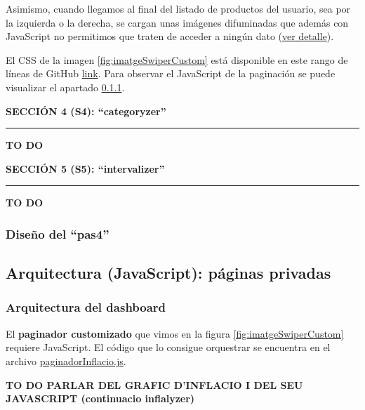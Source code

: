 \documentclass[a4paper,12pt]{report}
\begin{document}
	Asimismo, cuando llegamos al final del listado de productos del usuario, sea por la izquierda o la derecha, se cargan unas imágenes difuminadas que además con JavaScript no permitimos que traten de acceder a ningún dato (\href{https://github.com/blackcub3s/mercApp/blob/main/APP%20WEB/__frontend__produccio__/app/img/dashboard/paginadorEsqDifuminat.png}{ver detalle}).
	
	El CSS de la imagen \ref{fig:imatgeSwiperCustom} está disponible en este rango de líneas de GitHub \href{https://github.com/blackcub3s/mercApp/blob/4ddc34194763af7a246ffabb14146ad9b4b2c5db/APP%20WEB/__frontend__produccio__/app/css/dashboard/estils.css#L155}{link}. Para observar el JavaScript de la paginación se puede visualizar el apartado \ref{sec:paginadorJavascriptArquitectura}.
	
	
	
	
	\noindent \textbf{SECCIÓN 4 (S4): ``categoryzer''}
	\hrule
	\vspace{.5em}
	
	\textbf{TO DO}
	
	
	\noindent \textbf{SECCIÓN 5 (S5): ``intervalizer''}
	\hrule
	\vspace{.5em}
	
	\textbf{TO DO}
	
	\subsubsection{Diseño del ``pas4''}
	
	\subsection{Arquitectura (JavaScript): páginas privadas}
	
	\subsubsection{Arquitectura del dashboard}
	\label{sec:paginadorJavascriptArquitectura}
	
	El \textbf{paginador customizado} que vimos en la figura \ref{fig:imatgeSwiperCustom} requiere JavaScript. El código que lo consigue orquestrar se encuentra en el archivo \href{https://github.com/blackcub3s/mercApp/blob/main/APP%20WEB/__frontend__produccio__/app/js/dashboard/paginadorInflacio.js}{paginadorInflacio.js}.
	
	\textbf{TO DO PARLAR DEL GRAFIC D'INFLACIO I DEL SEU JAVASCRIPT (continuacio inflalyzer)}
	
\end{document}
